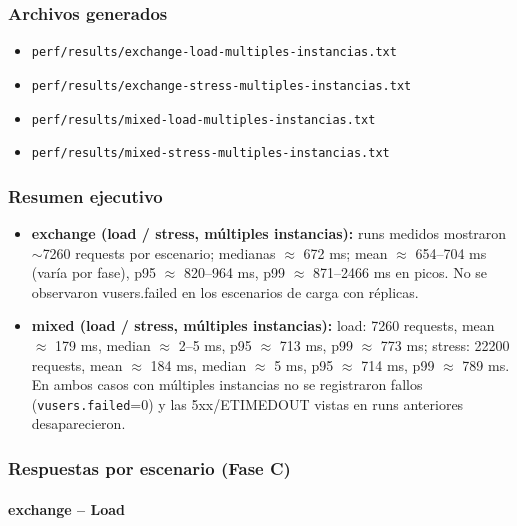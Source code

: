 \subsubsection{Archivos generados}

\begin{itemize}[leftmargin=*]
    \item \texttt{perf/results/exchange-load-multiples-instancias.txt}
    \item \texttt{perf/results/exchange-stress-multiples-instancias.txt}
    \item \texttt{perf/results/mixed-load-multiples-instancias.txt}
    \item \texttt{perf/results/mixed-stress-multiples-instancias.txt}
\end{itemize}

\subsubsection{Resumen ejecutivo}

\begin{itemize}[leftmargin=*]
    \item \textbf{exchange (load / stress, múltiples instancias):} runs medidos mostraron $\sim$7260 requests por escenario; medianas $\approx$ 672 ms; mean $\approx$ 654--704 ms (varía por fase), p95 $\approx$ 820--964 ms, p99 $\approx$ 871--2466 ms en picos. No se observaron vusers.failed en los escenarios de carga con réplicas.

    \item \textbf{mixed (load / stress, múltiples instancias):} load: 7260 requests, mean $\approx$ 179 ms, median $\approx$ 2--5 ms, p95 $\approx$ 713 ms, p99 $\approx$ 773 ms; stress: 22200 requests, mean $\approx$ 184 ms, median $\approx$ 5 ms, p95 $\approx$ 714 ms, p99 $\approx$ 789 ms. En ambos casos con múltiples instancias no se registraron fallos (\texttt{vusers.failed}=0) y las 5xx/ETIMEDOUT vistas en runs anteriores desaparecieron.
\end{itemize}

\subsubsection{Respuestas por escenario (Fase C)}

\paragraph{exchange -- Load}

